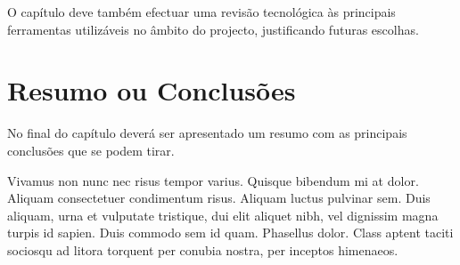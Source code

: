 O capítulo deve também efectuar uma revisão tecnológica às principais
ferramentas utilizáveis no âmbito do projecto, justificando futuras
escolhas.


\section{Resumo ou Conclusões}

No final do capítulo deverá ser apresentado um resumo com as 
principais conclusões que se podem tirar. 

Vivamus non nunc nec risus tempor varius. Quisque bibendum mi at
dolor. Aliquam consectetuer condimentum risus. Aliquam luctus pulvinar
sem. Duis aliquam, urna et vulputate tristique, dui elit aliquet nibh,
vel dignissim magna turpis id sapien. Duis commodo sem id
quam. Phasellus dolor. Class aptent taciti sociosqu ad litora torquent
per conubia nostra, per inceptos himenaeos. 
